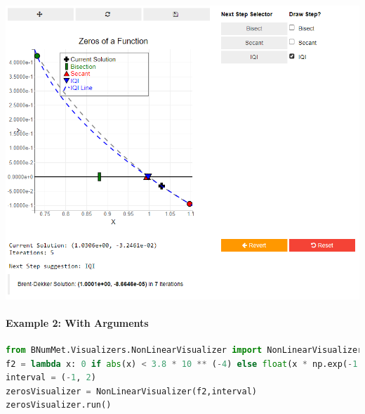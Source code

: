 \begin{enumerate}
    \includegraphics[scale=0.6]{Include/Images/Thesis/Documentation/Visualizers/NonLinear/Example 1/Example 1 - 04 - IQI checkbox only.png}
\end{enumerate}



\paragraph{Example 2: With Arguments}
\begin{lstlisting}[language=Python]
from BNumMet.Visualizers.NonLinearVisualizer import NonLinearVisualizer
f2 = lambda x: 0 if abs(x) < 3.8 * 10 ** (-4) else float(x * np.exp(-1 / x**2))
interval = (-1, 2)
zerosVisualizer = NonLinearVisualizer(f2,interval)
zerosVisualizer.run()
\end{lstlisting}

